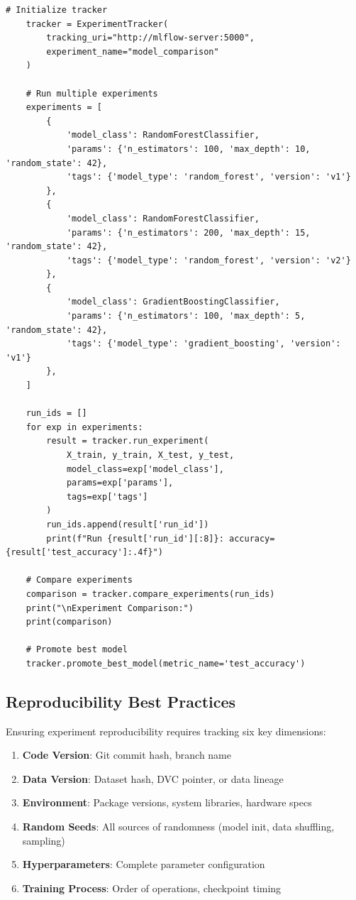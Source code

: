 \begin{lstlisting}[style=python, caption=Comprehensive MLflow experiment tracking]
    # Initialize tracker
    tracker = ExperimentTracker(
        tracking_uri="http://mlflow-server:5000",
        experiment_name="model_comparison"
    )

    # Run multiple experiments
    experiments = [
        {
            'model_class': RandomForestClassifier,
            'params': {'n_estimators': 100, 'max_depth': 10, 'random_state': 42},
            'tags': {'model_type': 'random_forest', 'version': 'v1'}
        },
        {
            'model_class': RandomForestClassifier,
            'params': {'n_estimators': 200, 'max_depth': 15, 'random_state': 42},
            'tags': {'model_type': 'random_forest', 'version': 'v2'}
        },
        {
            'model_class': GradientBoostingClassifier,
            'params': {'n_estimators': 100, 'max_depth': 5, 'random_state': 42},
            'tags': {'model_type': 'gradient_boosting', 'version': 'v1'}
        },
    ]

    run_ids = []
    for exp in experiments:
        result = tracker.run_experiment(
            X_train, y_train, X_test, y_test,
            model_class=exp['model_class'],
            params=exp['params'],
            tags=exp['tags']
        )
        run_ids.append(result['run_id'])
        print(f"Run {result['run_id'][:8]}: accuracy={result['test_accuracy']:.4f}")

    # Compare experiments
    comparison = tracker.compare_experiments(run_ids)
    print("\nExperiment Comparison:")
    print(comparison)

    # Promote best model
    tracker.promote_best_model(metric_name='test_accuracy')
\end{lstlisting}

\subsection{Reproducibility Best Practices}

Ensuring experiment reproducibility requires tracking six key dimensions:

\begin{enumerate}
    \item \textbf{Code Version}: Git commit hash, branch name
    \item \textbf{Data Version}: Dataset hash, DVC pointer, or data lineage
    \item \textbf{Environment}: Package versions, system libraries, hardware specs
    \item \textbf{Random Seeds}: All sources of randomness (model init, data shuffling, sampling)
    \item \textbf{Hyperparameters}: Complete parameter configuration
    \item \textbf{Training Process}: Order of operations, checkpoint timing
\end{enumerate}


